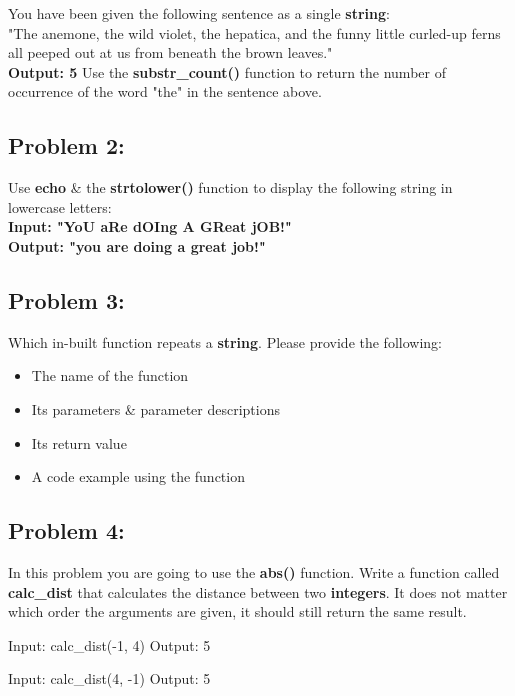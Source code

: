 \documentclass{article}
\begin{document}
You have been given the following sentence as a single \textbf{string}: \\

"The anemone, the wild violet, the hepatica, and the funny little curled-up ferns all peeped out at us from beneath the brown leaves." \\

\textbf{Output: 5} 
Use the \textbf{substr\_count()} function to return the number of occurrence of the word "the" in the sentence above.

\subsection{Problem 2:}
Use \textbf{echo} \& the \textbf{strtolower()} function to display the following string in lowercase letters: \\

\textbf{Input: "YoU aRe dOIng A GReat jOB!"} \\
\textbf{Output: "you are doing a great job!"}

\subsection*{Problem 3:}
Which in-built function repeats a \textbf{string}. Please provide the following:
\begin{itemize}
    \item The name of the function
    \item Its parameters \& parameter descriptions
    \item Its return value
    \item A code example using the function
\end{itemize}

\subsection*{Problem 4:}
In this problem you are going to use the \textbf{abs()} function. Write a function called \textbf{calc\_dist} that calculates the distance between two \textbf{integers}. It does not matter which order the arguments are given, it should still return the same result. 

\begin{verbatim*}
    Input: calc_dist(-1, 4)
    Output: 5 

    Input: calc_dist(4, -1)
    Output: 5 
\end{verbatim*}
\end{document}
